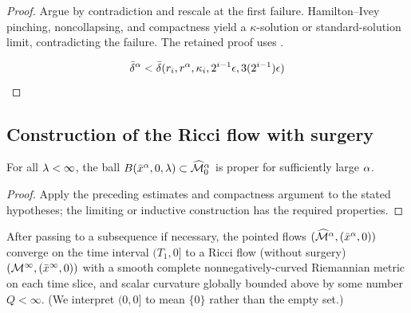 \begin{proof}
\sketch Argue by contradiction and rescale at the first failure. Hamilton--Ivey pinching, noncollapsing, and compactness yield a $\kappa$-solution or standard-solution limit, contradicting the failure.
The retained proof uses \cite[Corollary 7.7]{Chow-Knopf}.

\begin{equation}
\label{F_1condition}
\bar{\delta}^{\alpha}<\bar{\delta}(r_i,r^\alpha,\kappa_i,2^{i-1}\epsilon,3(2^{i-1})\epsilon)
\end{equation}
\end{proof}

\subsection{Construction of the Ricci flow with surgery}  \label{surgeryflow}

\begin{lemma}
  \label{lem:kl-construction-ricci-flow-surgery-ricci-flow-surgery-lemma}

For all $\lambda<\infty$,
the ball $B(\bar x^\alpha,0,\lambda)\subset\widehat{{\mathcal M}}^\alpha_0$
is proper for sufficiently
large $\alpha$.
\end{lemma}

\begin{proof}
\sketch Apply the preceding estimates and compactness argument to the stated hypotheses; the limiting or inductive construction has the required properties.
\end{proof}

\begin{lemma}
  \label{lem:kl-construction-ricci-flow-surgery-convergence-ricci-flow-surgery}
 \label{bdrysmoothness}
After passing to a subsequence
if necessary, the pointed flows  $(\widehat{{\mathcal M}}^\alpha,(\bar x^\alpha,0))$
converge on the time interval $(T_1, 0]$ to a Ricci flow (without
surgery) $({\mathcal M}^\infty,(\bar x^\infty,0))$ with
a smooth complete nonnegatively-curved Riemannian metric
on each time slice, and
scalar curvature globally bounded above by
some number $Q<\infty$.
(We interpret $(0, 0]$ to mean $\{0\}$ rather than the
empty set.)
\end{lemma}

